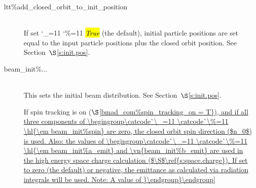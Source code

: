 \documentclass{hitec}
\newcommand\dottcmd[1]{\hl{\em#1}\endgroup}
\newcommand{\vn}{\begingroup\catcode`\_=11 \catcode`\%=11 \dottcmd}
\newcommand{\Newline}{\hfil \\}
\newcommand{\sref}[1]{$\S$\ref{#1}}
\begin{document}
{{{{{{{{{{{{{{{{{{\begin{description}
\item[ltt\%add_closed_orbit_to_init_position] \Newline
If set \vn{True} (the default), initial particle positions are set equal to the input particle positions
plus the closed orbit position. See Section~\sref{s:init.pos}.
%
\item[beam_init\%...] \Newline
This sets the initial beam distribution. See Section~\sref{s:init.pos}. 

If spin tracking is on (\sref{bmad_com%
\vn{beam_init%

Also: the values of \vn{beam_init%
space charge calculation (\sref{s:space.charge}). If set to zero (the default) or negative, the
emittance as calculated via radiation integrals will be used. Note: A value of

}}}
\end{description}}}}}}}}}}}}}}}}}}}
\end{document}
